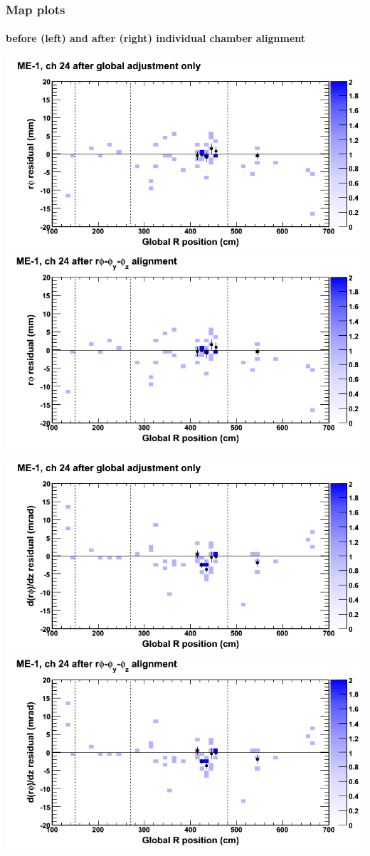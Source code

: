 \documentclass[compress]{beamer}
\begin{document}
\begin{frame}
\frametitle{Map plots}
\framesubtitle{before (left) and after (right) individual chamber alignment}
\includegraphics[width=0.5\linewidth]{ringmapplots_3dof/before_CSCvsr_mem1ch24_x.png} \includegraphics[width=0.5\linewidth]{ringmapplots_3dof/after_CSCvsr_mem1ch24_x.png}

\includegraphics[width=0.5\linewidth]{ringmapplots_3dof/before_CSCvsr_mem1ch24_dxdz.png} \includegraphics[width=0.5\linewidth]{ringmapplots_3dof/after_CSCvsr_mem1ch24_dxdz.png}
\end{frame}
\end{document}
